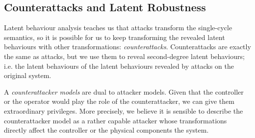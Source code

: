 {\subsection{Counterattacks and Latent Robustness}
\label{sec:CounterAttacks}
Latent behaviour analysis teaches us that attacks transform the single-cycle semantics, so it is possible for us to keep transforming the revealed latent behaviours with other transformations: \emph{counterattacks}. Counterattacks are exactly the same as attacks, but we use them to reveal second-degree latent behaviours; i.e. the latent behaviours of the latent behaviours revealed by attacks on the original system. 


A \emph{counterattacker models} are dual to attacker models. Given that the controller or the operator would play the role of the counterattacker, we can give them extraordinary privileges. More precisely, we believe it is sensible to describe the counterattacker model as a rather capable attacker whose transformations directly affect the controller or the physical components the system. 

}
